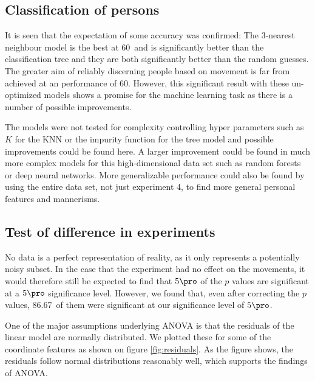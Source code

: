 \documentclass[11pt,fleqn]{article}
\begin{document}
\subsection{Classification of persons}
It is seen that the expectation of some accuracy was confirmed: The 3-nearest neighbour model is the best at 60\pro\ and is significantly better than the classification tree and they are both significantly better than the random guesses. The greater aim of reliably discerning people based on movement is far from achieved at an performance of 60\pro. However, this significant result with these un-optimized models shows a promise for the machine learning task as there is a number of possible improvements. 



The models were not tested for complexity controlling hyper parameters such as \(K\) for the KNN or the impurity function for the tree model and possible improvements could be found here. A larger improvement could be found in much more complex models for this high-dimensional data set such as random forests or deep neural networks. More generalizable performance could also be found by using the entire data set, not just experiment 4, to find more general personal  features and mannerisms.

\subsection{Test of difference in experiments}
No data is a perfect representation of reality, as it only represents a potentially noisy subset.
In the case that the experiment had no effect on the movements, it would therefore still be expected to find that $ 5\pro $ of the $ p $ values are significant at a $ 5\pro $ significance level.
However, we found that, even after correcting the $ p $ values, 86.67\pro\ of them were significant at our significance level of $ 5\pro $.

One of the major assumptions underlying ANOVA is that the residuals of the linear model are normally distributed.
We plotted these for some of the coordinate features as shown on figure \ref{fig:residuals}.
As the figure shows, the residuals follow normal distributions reasonably well, which supports the findings of ANOVA.
\end{document}
